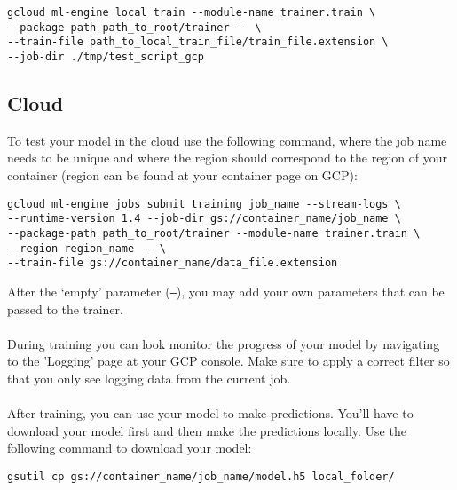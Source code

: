 \documentclass{article}
\begin{document}
\begin{verbatim}
gcloud ml-engine local train --module-name trainer.train \ 
--package-path path_to_root/trainer -- \
--train-file path_to_local_train_file/train_file.extension \
--job-dir ./tmp/test_script_gcp
\end{verbatim}


\subsection{Cloud}
To test your model in the cloud use the following command, where the job name needs to be unique and where the region should correspond to the region of your container (region can be found at your container page on GCP):
\begin{verbatim}
gcloud ml-engine jobs submit training job_name --stream-logs \
--runtime-version 1.4 --job-dir gs://container_name/job_name \
--package-path path_to_root/trainer --module-name trainer.train \
--region region_name -- \
--train-file gs://container_name/data_file.extension
\end{verbatim}
After the `empty' parameter (\texttt{--}), you may add your own parameters that can be passed to the trainer. \\
\\
During training you can look monitor the progress of your model by navigating to the 'Logging' page at your GCP console. Make sure to apply a correct filter so that you only see logging data from the current job.
\\
\\
After training, you can use your model to make predictions. You'll have to download your model first and then make the predictions locally. Use the following command to download your model:
\begin{verbatim}
gsutil cp gs://container_name/job_name/model.h5 local_folder/
\end{verbatim}
\end{document}
